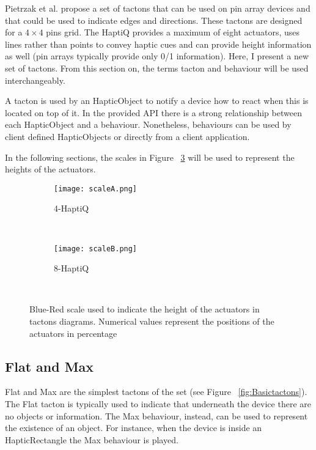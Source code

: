 Pietrzak et al. \cite{pietrzak2009creating} propose a set of tactons that can be used on pin array devices and that could be used to indicate edges and directions. These tactons are designed for a $4 \times 4$ pins grid. The HaptiQ provides a maximum of eight actuators, uses lines rather than points to convey haptic cues and can provide height information as well (pin arrays typically provide only 0/1 information). Here, I present a new set of tactons. From this section on, the terms tacton and behaviour will be used interchangeably.

A tacton is used by an HapticObject to notify a device how to react when this is located on top of it. In the provided API there is a strong relationship between each HapticObject and a behaviour. Nonetheless, behaviours can be used by client defined HapticObjects or directly from a client application.

In the following sections, the scales in Figure ~\ref{fig:scales} will be used to represent the heights of the actuators.

\begin{figure}[H]
        \centering
        \begin{subfigure}[H]{0.7\textwidth}
                \texttt{[image: scaleA.png]}
                \caption{4-HaptiQ}
                \label{fig:scale-4}
        \end{subfigure}%
        ~ %
          
        \begin{subfigure}[H]{0.7\textwidth}
                \texttt{[image: scaleB.png]}
                \caption{8-HaptiQ}
                \label{fig:scale-8}
        \end{subfigure}
        ~ %
        \caption{Blue-Red scale used to indicate the height of the actuators in tactons diagrams. Numerical values represent the positions of the actuators in percentage}
        \label{fig:scales}
\end{figure}

\subsection{Flat and Max}

Flat and Max are the simplest tactons of the set (see Figure ~\ref{fig:Basictactons}). The Flat tacton is typically used to indicate that underneath the device there are no objects or information. The Max behaviour, instead, can be used to represent the existence of an object. For instance, when the device is inside an HapticRectangle the Max behaviour is played. 

